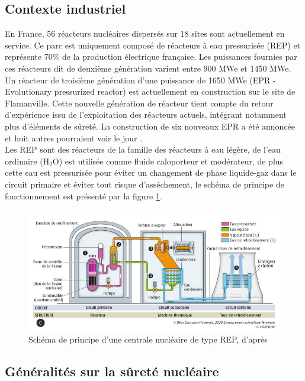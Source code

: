 \subsection{Contexte industriel}
En France, 56 réacteurs nucléaires dispersés sur 18 sites sont actuellement en service. Ce parc est uniquement composé de réacteurs à eau pressurisée (REP) et représente 70\% de la production électrique française. Les puissances fournies par ces réacteurs dit de deuxième génération varient entre 900 MWe et 1450 MWe. Un réacteur de troisième génération d'une puissance de 1650 MWe (EPR - Evolutionary pressurized reactor) est actuellement en construction sur le site de Flamanville. Cette nouvelle génération de réacteur tient compte du retour d'expérience issu de l'exploitation des réacteurs actuels, intégrant notamment plus d'éléments de sûreté. La construction de six nouveaux EPR a été annoncée et huit autres pourraient voir le jour \cite{noauthor_emmanuel_2021}. \\
Les REP sont des réacteurs de la famille des réacteurs à eau légère, de l'eau ordinaire (H$_2$O) est utilisée comme fluide caloporteur et modérateur, de plus cette eau est pressurisée pour éviter un changement de phase liquide-gaz dans le circuit primaire et éviter tout risque d'asséchement, le schéma de principe de fonctionnement est présenté par la figure \ref{fig:schcentrale1}. %
\begin{figure}[H]
	\centering
	\includegraphics[width=0.9\linewidth]{figure/sch_centrale1}
	\caption[Schéma de principe d'une centrale nucléaire de type REP]{Schéma de principe d'une centrale nucléaire de type REP, d'après \cite{noauthor_manuel_nodate}}
	\label{fig:schcentrale1}
\end{figure} 
\subsection{Généralités sur la sûreté nucléaire}

